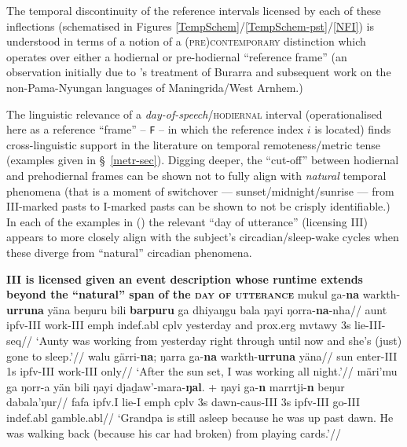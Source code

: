 The temporal discontinuity of the reference intervals licensed by each of these inflections (schematised in Figures \ref{TempSchem}/\ref{TempSchem-pst}/\ref{NFI}) is understood in terms of a notion of a \textsc{(pre)contemporary} distinction which operates over either a hodiernal or pre-ho\-diernal ``reference frame'' (an observation initially due to \citeauthor{Glasgow1964}'s treatment of Burarra and subsequent work on the non-Pama-Nyungan languages of Maningrida/West Arnhem.)

The linguistic relevance of a \textit{day-of-speech}/\textsc{hodiernal} interval (operationalised here as a reference ``frame'' -- \texttt{F} -- in which the reference index $ i $ is located) finds cross-linguistic support in the literature on temporal remoteness/metric tense (examples given in \S~\ref{metr-sec}). Digging deeper, the ``cut-off'' between hodiernal and prehodiernal frames can be shown not to fully align with \textit{natural} temporal phenomena (that is a moment of switchover --- sunset/midnight/sunrise --- from \gls{III}-marked pasts to \gls{I}-marked pasts can be shown to not be crisply identifiable.) In each of the examples in (\nextx) the relevant ``day of utterance'' (licensing \gls{III}) appears to more closely align with the subject's circadian/sleep-wake cycles when these diverge from ``natural'' circadian phenomena.



\pex\textbf{\gls{III} is licensed given an event description whose runtime extends beyond the ``natural'' span of the \textsc{day of utterance} }
\a\begingl
\gla mukul ga-\textbf{na} warkth-\textbf{urruna} yäna beŋuru bili \textbf{barpuru} ga dhiyaŋgu bala ŋayi ŋorra-\textbf{na}-nha//
\glb aunt \gls{ipfv}-\gls{III} work-\gls{III} \gls{emph} \gls{indef}.\gls{abl} \gls{cplv} yesterday and \gls{prox}.\gls{erg} \gls{mvtawy} 3s lie-\gls{III}-\gls{seq}//
\glft`Aunty was working from yesterday right through until now and she's (just) gone to sleep.'\trailingcitation{[DB~20190405]}//\endgl
\a\begingl\gla walu gärri-\textbf{na}; ŋarra ga-\textbf{na} warkth-\textbf{urruna} yäna//
\glb sun enter-\gls{III} 1s \gls{ipfv}-\gls{III} work-\gls{III} only//
\glft`After the sun set, I was working all night.'\trailingcitation{[DB~20190405]}//\endgl
\a\begingl
\gla märi’mu ga ŋorr-a yän bili ŋayi djaḏaw’-mara-\textbf{ŋal}. + ŋayi ga-\textbf{n} marrtji-\textbf{n} \nogloss{[...]} beŋur dabala'ŋur//
\glb \gls{fa}\gls{fa} \gls{ipfv}.\gls{I} lie-\gls{I} \gls{emph} \gls{cplv} 3s dawn-\gls{caus}-\gls{III} 3s \gls{ipfv}-\gls{III} go-\gls{III} \gls{indef}.\gls{abl} gamble.\gls{abl}//
\glft`Grandpa is still asleep because he was up past dawn. He was walking back (because his car had broken) from playing cards.'\trailingcitation{[AW~20190410]}//\endgl
\xe

